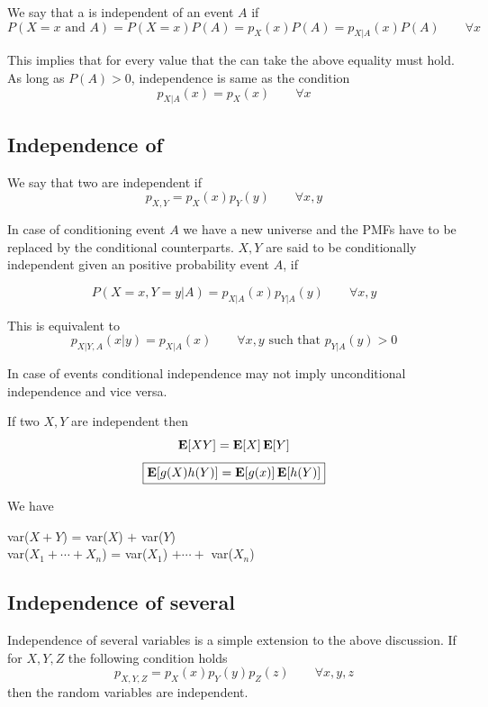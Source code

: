 We say that a \rv is independent of an event $A$ if 
\[\boxed{P(X=x \text{ and } A)=P(X=x)P(A)=p_X(x)P(A)=p_{X|A}(x)P(A)} \qquad \forall x\]

This implies that for every value that the \rv can take the above equality must hold. As long as $P(A)>0$, independence is same as the condition
\[ \boxed{p_{X|A}(x) = p_X(x)} \qquad \forall x\]

\subsection{Independence of \RV}
We say that two \rv are independent if
\[\boxed{p_{X,Y}=p_X(x)p_Y(y)} \qquad \forall x,y\]

In case of conditioning event $A$ we have a new universe and the PMFs have to be replaced by the conditional counterparts. $X, Y$ are said to be conditionally independent given an positive probability event $A$, if

\[\boxed{P(X=x, Y=y | A) = p_{X|A}(x) p_{Y|A}(y)} \qquad \forall x,y\]

This is equivalent to 
\[p_{X|Y,A}(x|y)=p_{X|A}(x) \qquad \forall x,y \text{ such that } p_{Y|A}(y)>0\]

\begin{remark}
    In case of events conditional independence may not imply unconditional independence and vice versa.
\end{remark}

If two $X, Y$ are independent then 
\[\operatorname{\textbf{E}}[XY]=\operatorname{\textbf{E}}[X]\operatorname{\textbf{E}}[Y]\] 
\[ \boxed{\operatorname{\textbf{E}}[g(X)h(Y)]=\operatorname{\textbf{E}}[g(x)]\operatorname{\textbf{E}}[h(Y)]}\]

We have
\begin{center}
    var($X+Y$) = var($X$) $+$ var($Y$) \\
    var($X_1+\cdots+X_n$) = var($X_1$) $+ \cdots+$ var($X_n$) 
\end{center}

\subsection{Independence of several \RV}
Independence of several variables is a simple extension to the above discussion. If for $X, Y, Z$ the following condition holds
\[p_{X,Y,Z}=p_X(x)p_Y(y)p_Z(z)  \qquad \forall x,y,z\]
then the random variables are independent.
